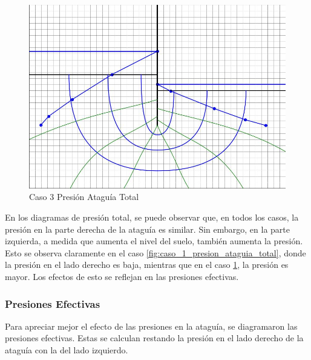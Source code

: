 \begin{figure}[H]
\begin{minipage}{0.32\textwidth}
        \centering
        \includegraphics[width=\textwidth]{GRAFICOS/caso_3_presion_ataguia_total.jpg}
        \caption{Caso 3 Presión Ataguía Total}
        \label{fig:caso_3_presion_ataguia_total}
    \end{minipage}
\end{figure}

En los diagramas de presión total, se puede observar que, en todos los casos, la presión en la parte derecha de la ataguía es similar. Sin embargo, en la parte izquierda, a medida que aumenta el nivel del suelo, también aumenta la presión. Esto se observa claramente en el caso \ref{fig:caso_1_presion_ataguia_total}, donde la presión en el lado derecho es baja, mientras que en el caso \ref{fig:caso_3_presion_ataguia_total}, la presión es mayor. Los efectos de esto se reflejan en las presiones efectivas.

\subsubsection{Presiones Efectivas}

Para apreciar mejor el efecto de las presiones en la ataguía, se diagramaron las presiones efectivas. Estas se calculan restando la presión en el lado derecho de la ataguía con la del lado izquierdo.

